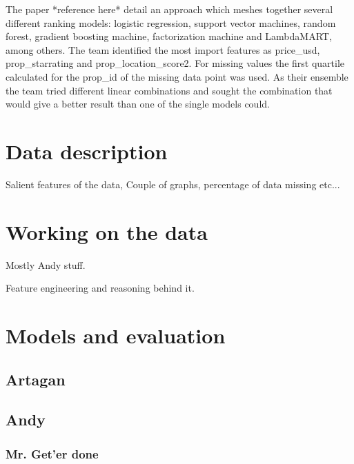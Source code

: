 \documentclass{llncs}
\begin{document}
The paper *reference here* detail an approach which meshes together several different ranking models: logistic regression, support vector machines, random forest, gradient boosting machine, factorization machine and LambdaMART, among others. The team identified the most import features as price\_usd, prop\_starrating and prop\_location\_score2. For missing values the first quartile calculated for the prop\_id of the missing data point was used. As their ensemble the team tried different linear combinations and sought the combination that would give a better result than one of the single models could.  

 
\section{Data description}

Salient features of the data, Couple of graphs, percentage of data missing etc...

\section{Working on the data}

Mostly Andy stuff.

Feature engineering and reasoning behind it.


\section{Models and evaluation}

\subsection*{Artagan}

\subsection*{Andy}

\subsubsection*{Mr. Get'er done}


          


\end{document}
